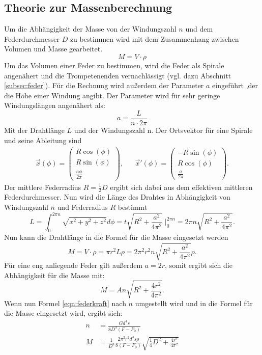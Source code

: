 \subsection{Theorie zur Massenberechnung}
Um die Abhängigkeit der Masse von der Windungszahl $n$ und dem Federdurchmesser $D$ zu bestimmen wird mit dem Zusammenhang zwischen Volumen und Masse gearbeitet.
\begin{equation}
    M = V \cdot \rho
\end{equation}
Um das Volumen einer Feder zu bestimmen, wird die Feder als Spirale angenähert und die Trompetenenden vernachlässigt (vgl. dazu Abschnitt \ref{subsec:feder}).
Für die Rechnung wird außerdem der Parameter $a$ eingeführt ,der die Höhe einer Windung angibt.
Der Parameter wird für sehr geringe Windungslängen angenähert als:
\begin{equation}
    a = \frac{L}{n\cdot 2\pi}
\end{equation}
Mit der Drahtlänge $L$ und der Windungszahl n.
Der Ortsvektor für eine Spirale und seine Ableitung sind
\begin{align}
    \vec{x}(\phi) = \left(\begin{array}{c} R\cos(\phi) \\ R\sin(\phi) \\ \frac{a \phi}{2\pi} \end{array}\right), && \vec{x}'(\phi) = \left(\begin{array}{c} -R\sin(\phi) \\ R\cos(\phi) \\ \frac{a}{2\pi} \end{array}\right).
\end{align}
Der mittlere Federradius $R = \frac{1}{2} D$ ergibt sich dabei aus dem effektiven mittleren Federdurchmesser.
Nun wird die Länge des Drahtes in Abhängigkeit von Windungszahl $n$ und Federradius $R$ bestimmt
\begin{equation}
    L = \int_{0}^{2\pi n} \sqrt{x^2+y^2+z^2}d\phi = t \sqrt{R^2+\frac{a^2}{4\pi^2}} \; |_{0}^{2\pi n} = 2\pi n \sqrt{R^2+\frac{a^2}{4\pi^2}}.
\end{equation}
Nun kann die Drahtlänge in die Formel für die Masse eingesetzt werden
\begin{equation}
    M = V\cdot \rho = \pi r^2 L \rho = 2 \pi^2 r^2 n \sqrt{R^2 + \frac{a^2}{4\pi^2}} \rho.
\end{equation}
Für eine eng anliegende Feder gilt außerdem $a = 2r$, 
somit ergibt sich die Abhängigkeit für die Masse mit:
\begin{equation}
    M = An \sqrt{R^2 + \frac{4r^2}{4\pi^2}}.
    \label{eqn:masse}
\end{equation}
Wenn nun Formel \ref{eqn:federkraft} nach $n$ umgestellt wird und in die Formel für die Masse eingesetzt wird, ergibt sich:
\begin{align}
    n &= \frac{G d^4 s}{8 D^3 (F-F_0)}\\
    M &= \frac{1}{D^3} \frac{2\pi^2r^2d^4s\rho}{8(F-F_0)} \sqrt{\frac{1}{4} D^2 + \frac{4r^2}{4\pi^2}}
\end{align}
\label{sec:theorie}